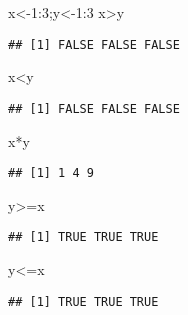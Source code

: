\documentclass[
]{book}
\newenvironment{Shaded}{\begin{snugshade}}{\end{snugshade}}
\newcommand{\DecValTok}[1]{\textcolor[rgb]{0.00,0.00,0.81}{#1}}
\newcommand{\NormalTok}[1]{#1}
\newcommand{\OtherTok}[1]{\textcolor[rgb]{0.56,0.35,0.01}{#1}}
\newcommand{\SpecialCharTok}[1]{\textcolor[rgb]{0.00,0.00,0.00}{#1}}
\begin{document}
\begin{Shaded}
\begin{Highlighting}[]
\NormalTok{x}\OtherTok{\textless{}{-}}\DecValTok{1}\SpecialCharTok{:}\DecValTok{3}\NormalTok{;y}\OtherTok{\textless{}{-}}\DecValTok{1}\SpecialCharTok{:}\DecValTok{3}
\NormalTok{x}\SpecialCharTok{\textgreater{}}\NormalTok{y}
\end{Highlighting}
\end{Shaded}

\begin{verbatim}
## [1] FALSE FALSE FALSE
\end{verbatim}

\begin{Shaded}
\begin{Highlighting}[]
\NormalTok{x}\SpecialCharTok{\textless{}}\NormalTok{y}
\end{Highlighting}
\end{Shaded}

\begin{verbatim}
## [1] FALSE FALSE FALSE
\end{verbatim}

\begin{Shaded}
\begin{Highlighting}[]
\NormalTok{x}\SpecialCharTok{*}\NormalTok{y}
\end{Highlighting}
\end{Shaded}

\begin{verbatim}
## [1] 1 4 9
\end{verbatim}

\begin{Shaded}
\begin{Highlighting}[]
\NormalTok{y}\SpecialCharTok{\textgreater{}=}\NormalTok{x}
\end{Highlighting}
\end{Shaded}

\begin{verbatim}
## [1] TRUE TRUE TRUE
\end{verbatim}

\begin{Shaded}
\begin{Highlighting}[]
\NormalTok{y}\SpecialCharTok{\textless{}=}\NormalTok{x}
\end{Highlighting}
\end{Shaded}

\begin{verbatim}
## [1] TRUE TRUE TRUE
\end{verbatim}
\end{document}
